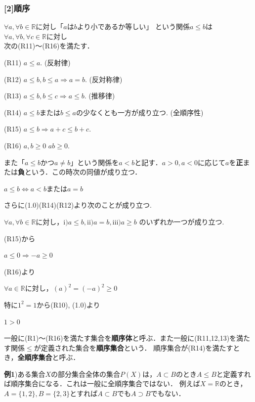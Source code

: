 \documentclass{ltjsarticle}
\theoremstyle{definition}
\theoremstyle{propcorollarystyle}
\theoremstyle{thmcorollarystyle}
\begin{document}
\subsubsection*{[2]順序}
$\forall a,\forall b \in \mathbb{R}$に対し「$aはb$より小であるか等しい」
という関係$a\le b$は$\forall a,\forall b,\forall c \in \mathbb{R}$に対し\\次の(R11)～(R16)を満たす．\par
 (R11) $a\le a$. (反射律)\par
 (R12) $a \le b, b \le a \Rightarrow a=b$. (反対称律)\par
 (R13) $a \le b, b \le c \Rightarrow a \le b$. (推移律)\par
 (R14) $a \le b$または$b \le a$の少なくとも一方が成り立つ. (全順序性)\par
 (R15) $a \le b \Rightarrow a+c \le b+c$.\par
 (R16) $a,b \ge 0$ \Rightarrow $ab \ge 0$.\par
また「$a \le b$かつ$a \neq b$」という関係を$a < b$と記す．$a > 0,a<0$に応じて$a$を\textbf{正}または\textbf{負}という．この時次の同値が成り立つ．\par
\noindent
{}
\hfil
$a \le b \iff a<b または a=b$
\hfil

 さらに(1.0)(R14)(R12)より次のことが成り立つ.\par
\noindent
{}
\hspace{1em}
 $\forall a, \forall b \in \mathbb{R}に対し，\mathrm{i}) a \le b, \mathrm{ii}) a = b, \mathrm{iii}) a \ge b$ のいずれか一つが成り立つ.\par
 (R15)から\par
\noindent
{}
\hfil
$a \le 0 \Rightarrow -a \ge  0$
\hfil
\par
 (R16)より\par
\noindent
{}
$\forall a \in \mathbb{R}$に対し，$(a)^{2} = (-a)^{2} \ge 0$\par
 特に$1^2=1$から(R10), (1.0)より\par
\noindent
{}
\hfil
$1 >0$\par
\hfil

一般に(R1)～(R16)を満たす集合を\textbf{順序体}と呼ぶ．また一般に(R11,12,13)を満たす関係$\le $が定義された集合を\textbf{順序集合}という．
順序集合が(R14)を満たすとき，\textbf{全順序集合}と呼ぶ． \par
\textbf{例1})ある集合$X$の部分集合全体の集合$P(X)$は，$A \subset B$のとき$A \le  B$と定義すれば順序集合になる．これは一般に全順序集合ではない．
例えば$X=\mathbb{R}$のとき，$A=\{1,2\}, B=\{2,3\}とすればA \subset B でもA \supset B$でもない．\par
\end{document}
